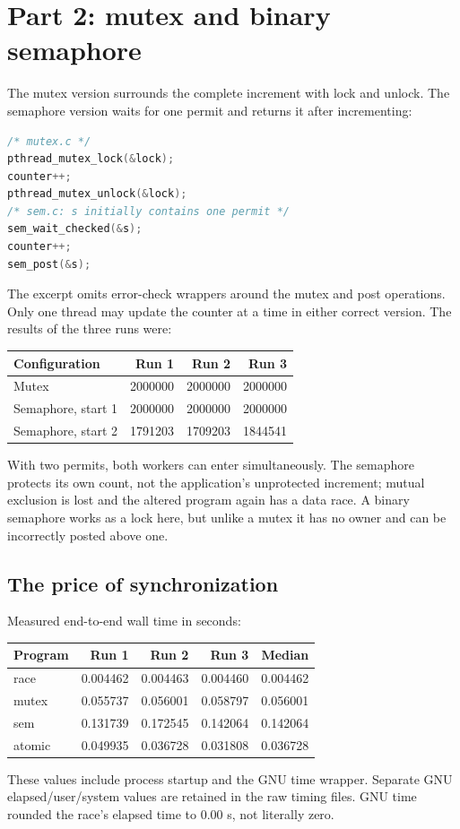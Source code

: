 \documentclass[12pt]{article}
\begin{document}
\section{Part 2: mutex and binary semaphore}
The mutex version surrounds the complete increment with lock and unlock.
The semaphore version waits for one permit and returns it after incrementing:
\begin{lstlisting}[language=C]
/* mutex.c */
pthread_mutex_lock(&lock);
counter++;
pthread_mutex_unlock(&lock);
/* sem.c: s initially contains one permit */
sem_wait_checked(&s);
counter++;
sem_post(&s);
\end{lstlisting}
The excerpt omits error-check wrappers around the mutex and post operations.
Only one thread may update the counter at a time in either correct version.
The results of the three runs were:
\begin{center}
\begin{tabular}{lrrr}
\toprule
Configuration & Run 1 & Run 2 & Run 3 \\
\midrule
Mutex & 2000000 & 2000000 & 2000000 \\
Semaphore, start 1 & 2000000 & 2000000 & 2000000 \\
Semaphore, start 2 & 1791203 & 1709203 & 1844541 \\
\bottomrule
\end{tabular}
\end{center}
With two permits, both workers can enter simultaneously. The semaphore
protects its own count, not the application's unprotected increment; mutual
exclusion is lost and the altered program again has a data race. A binary
semaphore works as a lock here, but unlike a mutex it has no owner and can
be incorrectly posted above one.

\subsection{The price of synchronization}
Measured end-to-end wall time in seconds:
\begin{center}
\begin{tabular}{lrrrr}
\toprule
Program & Run 1 & Run 2 & Run 3 & Median \\
\midrule
race & 0.004462 & 0.004463 & 0.004460 & 0.004462 \\
mutex & 0.055737 & 0.056001 & 0.058797 & 0.056001 \\
sem & 0.131739 & 0.172545 & 0.142064 & 0.142064 \\
atomic & 0.049935 & 0.036728 & 0.031808 & 0.036728 \\
\bottomrule
\end{tabular}
\end{center}
These values include process startup and the GNU time wrapper. Separate
GNU elapsed/user/system values are retained in the raw timing files.
GNU time rounded the race's elapsed time to 0.00 s, not literally zero.
\end{document}
